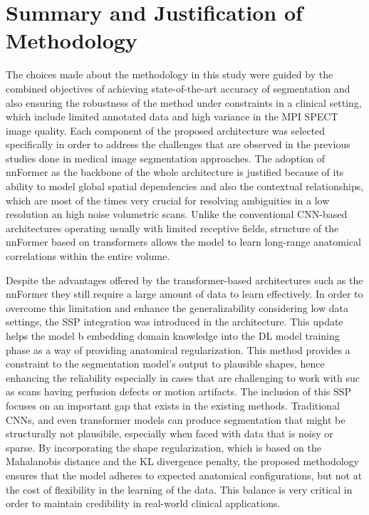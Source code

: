\section{Summary and Justification of Methodology}
The choices made about the methodology in this study were guided by the combined objectives of achieving state-of-the-art accuracy of segmentation and also ensuring the robustness of the method under constraints in a clinical setting, which include limited annotated data and high variance in the MPI SPECT image quality. Each component of the proposed architecture was selected specifically in order to address the challenges that are observed in the previous studies done in medical image segmentation approaches. The adoption of nnFormer as the backbone of the whole architecture is justified because of its ability to model global spatial dependencies and also the contextual relationships, which are most of the times very crucial for resolving ambiguities in a low resolution an high noise volumetric scans. Unlike the conventional CNN-based architectures operating usually with limited receptive fields, structure of the nnFormer based on transformers allows the model to learn long-range anatomical correlations within the entire volume.

Despite the advantages offered by the transformer-based architectures such as the nnFormer they still require a large amount of data to learn effectively. In order to overcome this limitation and enhance the generalizability considering low data settings, the SSP integration was introduced in the architecture. This update helps the model b embedding domain knowledge into the DL model training phase as a way of providing anatomical regularization. This method provides a constraint to the segmentation model's output to plausible shapes, hence enhancing the reliability especially in cases that are challenging to work with suc as scans having perfusion defects or motion artifacts. The inclusion of this SSP focuses on an important gap that exists in the existing methods. Traditional CNNs, and even transformer models can produce segmentation that might be structurally not plausibile, especially when faced with data that is noisy or sparse. By incorporating the shape regularization, which is based on the Mahalanobis distance and the KL divergence penalty, the proposed methodology ensures that the model adheres to expected anatomical configurations, but not at the cost of flexibility in the learning of the data. This balance is very critical in order to maintain credibility in real-world clinical applications.

